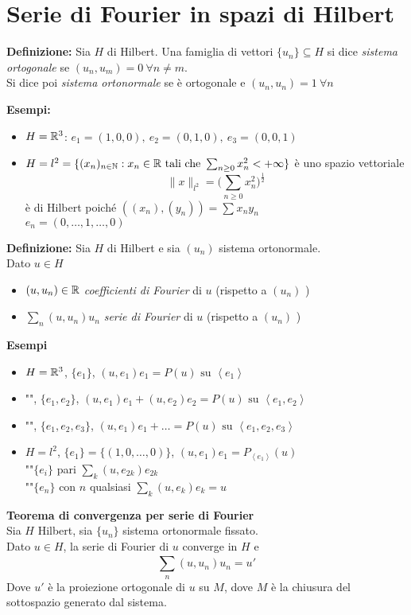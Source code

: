 \section{Serie di Fourier in spazi di Hilbert}
\begin{tcolorbox}
	\textbf{Definizione: }Sia $H$ di Hilbert. Una famiglia di vettori $\{u_n\} \subseteq  H$ si dice \emph{sistema ortogonale} se $(u_n,u_m)=0\ \forall n\neq m$. 
	\\Si dice poi \emph{sistema ortonormale} se è ortogonale e $(u_n,u_n)=1\ \forall n$
\end{tcolorbox}
\textbf{Esempi:} 
\begin{itemize}
	\item $H=\mathbb{R}^3$: $e_1=(1,0,0),\ e_2=(0,1,0),\ e_3=(0,0,1)$ 
	\item $H=l^2=\{(x_n)_{n\in \mathbb{N}}:x_n\in \mathbb{R}\text{ tali che }\sum_{n\ge 0}^{} x_n^2<+\infty\} $ è uno spazio vettoriale
		\[\|x\|_{l^2}=\bigg(\sum_{n\ge 0}^{} x_n^2 \bigg)^{\frac{1}{2}}\]
		è di Hilbert poiché $((x_n),(y_n))=\sum_{}^{} x_ny_n$ 
		\\$e_n=(0,\ldots,1,\ldots,0)$
\end{itemize}
\begin{tcolorbox}
	\textbf{Definizione: }Sia $H$ di Hilbert e sia $(u_n)$ sistema ortonormale.
	\\Dato $u\in H$ 
	\begin{itemize}
		\item $(u,u_n)\in \mathbb{R}$ \emph{coefficienti di Fourier} di $u$ (rispetto a $(u_n)$ )
		\item $\sum_{n}^{} (u,u_n)u_n$ \emph{serie di Fourier} di $u$ (rispetto a $(u_n)$ )
	\end{itemize}
\end{tcolorbox}
\textbf{Esempi} 
\begin{itemize}
	\item $H=\mathbb{R}^3$, $\{e_1\} $, $(u,e_1)e_1=P(u)\text{ su }\left< e_1 \right> $ 
	\item "", $\{e_1,e_2\} $, $(u,e_1)e_1+(u,e_2)e_2=P(u)\text{ su }\left< e_1,e_2 \right> $ 
	\item "", $\{e_1,e_2,e_3\} $, $(u,e_1)e_1+\ldots=P(u)\text{ su }\left< e_1,e_2,e_3 \right> $ 
	\item $H=l^2$, $\{e_1\} =\{(1,0,\ldots,0)\} $, $(u,e_1)e_1=P_{\left< e_1 \right> }(u)$
		\\""$\{e_i\} $ pari $\sum_{k}^{} (u,e_{2k})e_{2k}$
		\\""$\{e_n\} $ con $n$ qualsiasi $\sum_{k}^{} (u,e_k)e_k=u$ 
\end{itemize}
\begin{tcolorbox}
\textbf{Teorema di convergenza per serie di Fourier}
\\Sia $H$ Hilbert, sia $\{u_n\} $ sistema ortonormale fissato.
\\Dato $u\in H$, la serie di Fourier di $u$ converge in $H$ e 
\[\sum_{n}^{} (u,u_n)u_n=u'\]
Dove $u'$ è la proiezione ortogonale di $u$ su $M$, dove $M$ è la chiusura del sottospazio generato dal sistema.
\end{tcolorbox}
